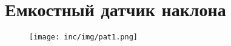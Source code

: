 \chapter{Емкостный датчик наклона}
\label{cha:appendix1}

\begin{figure}
\centering
\texttt{[image: inc/img/pat1.png]}
\end{figure}

